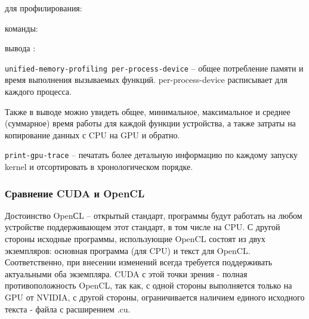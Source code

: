  для профилирования:

 команды:

 вывода \cite{Rutsh2011}: \\
\noindent{}

\texttt{{\textendash\textendash}unified-memory-profiling per-process-device} -- общее потребление памяти и время выполнения вызываемых функций. per-process-device расписывает для каждого процесса.

Также в выводе можно увидеть общее, минимальное, максимальное и среднее (суммарное) время работы для каждой функции устройства, а также затраты на копирование данных с CPU на GPU и обратно.

\texttt{{\textendash\textendash}print-gpu-trace} -- печатать более детальную информацию по каждому запуску kernel и отсортировать в хронологическом порядке.

\subsubsection*{Сравнение CUDA и OpenCL}
Достоинство OpenСL -- открытый стандарт, программы будут работать на любом устройстве поддерживающем этот стандарт, в том числе на CPU. С другой стороны исходные программы, использующие OpenCL состоят из двух экземпляров: основная программа (для CPU) и текст для OpenCL. Соответственно, при внесении изменений всегда требуется поддерживать актуальными оба экземпляра. CUDA с этой точки зрения - полная противоположность OpenCL, так как, с одной стороны выполняется только на GPU от NVIDIA, с другой стороны, ограничивается наличием единого исходного текста - файла с расширением .cu.

